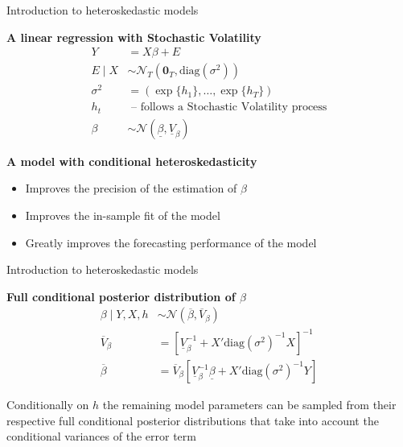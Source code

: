 \documentclass[notes,blackandwhite,mathsans,usenames,dvipsnames]{beamer}
\begin{document}
\begin{frame}{Introduction to heteroskedastic models}

\bigskip\textbf{A linear regression with Stochastic Volatility}
\begin{align*}
Y & = X\beta +E\\
E\mid X &\sim\mathcal{N}_T\left( \mathbf{0}_T, \text{diag}\left( \sigma^2\right)\right)\\[2ex]
\sigma^2 &= \left( \exp\{h_1\}, \dots, \exp\{h_T\} \right)\\
h_t &\text{ -- follows a Stochastic Volatility process}\\[1ex]
\beta &\sim\mathcal{N}\left( \underline\beta, \underline{V}_\beta\right)
\end{align*}

\bigskip\textbf{A model with conditional heteroskedasticity}
\begin{itemize}[label=$\blacktriangleright$]
\item Improves the precision of the estimation of $\beta$
\item Improves the in-sample fit of the model
\item Greatly improves the forecasting performance of the model
\end{itemize}

\end{frame}




\begin{frame}{Introduction to heteroskedastic models}

\bigskip\textbf{Full conditional posterior distribution of $\beta$}
\begin{align*}
\beta \mid Y,X,h &\sim\mathcal{N}\left( \overline\beta, \overline{V}_\beta\right)\\[2ex]
\overline{V}_\beta & = \left[ \underline{V}_\beta^{-1} + X'\text{diag}\left(\sigma^2\right)^{-1}X\right]^{-1}\\
\overline\beta &= \overline{V}_\beta \left[ \underline{V}_\beta^{-1}\underline\beta + X'\text{diag}\left(\sigma^2\right)^{-1}Y\right]
\end{align*}

\bigskip Conditionally on $h$ the remaining model parameters can be sampled from their respective full conditional posterior distributions that take into account the conditional variances of the error term
\end{frame}
\end{document}
